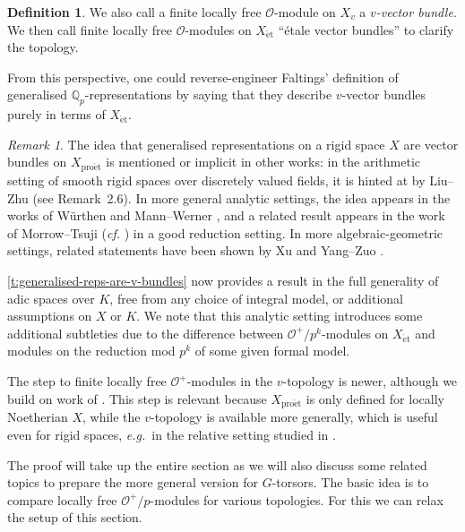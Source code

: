\documentclass[11pt]{amsart}
\numberwithin{equation}{section}
\theoremstyle{definition}
\newtheorem{Definition}[thm]{Definition}
\theoremstyle{remark}
\newtheorem{Remark}[thm]{Remark}
\renewcommand{\O}{\mathcal{O}}
\newcommand{\Q}{\mathbb{Q}}
\newcommand{\et}{{\operatorname{\acute{e}t}}}
\newcommand{\proet}{{\operatorname{pro\acute{e}t}}}
\begin{document}
\begin{Definition}
	We also call a finite locally free $\O$-module on $X_{v}$  a \emph{$v$-vector bundle}. We then call finite locally free $\O$-modules on $X_{\et}$ ``\'etale vector bundles'' to clarify the topology.
\end{Definition}


From this perspective, one could reverse-engineer Faltings' definition of generalised $\Q_p$-representations by saying that they describe $v$-vector bundles purely in terms of $X_{\et}$.

\begin{Remark}
  The idea that generalised representations on a rigid space $X$ are vector bundles on $X_{\proet}$  is mentioned or implicit in other works:  in the arithmetic setting of smooth rigid spaces over discretely valued fields, it is hinted at by Liu--Zhu \cite{LiuZhu_RiemannHilbert} (see Remark~2.6). In more general analytic  settings, the idea appears in the works of W\"urthen \cite[Introduction, p.~4006]{wuerthen_vb_on_rigid_var} and Mann--Werner \cite{MannWerner_LocSys_p-adVB}, and a related result appears in the work of Morrow--Tsuji (\textit{cf.} \cite[Theorem 5.7]{MorrowTsuji}) in a good reduction setting. In more algebraic-geometric settings, related statements have been shown by Xu  \cite[Section~3.29]{XuTransport_parallele} and Yang--Zuo \cite[Lemma~2.10]{YangZuo-padicSimpson}.
	
	 \cref{t:generalised-reps-are-v-bundles} now provides a result in the full generality of adic spaces over $K$, free from any choice of integral model, or additional assumptions on $X$ or $K$. We note that this analytic setting introduces some additional subtleties due to the difference between $\O^+/p^k$-modules on $X_{\et}$ and modules on the reduction mod $p^k$ of some given formal model.
	
	The step to finite locally free $\O^+$-modules in the $v$-topology is newer, although we build on work of \cite{MannWerner_LocSys_p-adVB}. This step is relevant because $X_{\proet}$  is only defined for locally Noetherian $X$, while the $v$-topology is available more generally, which is useful even for rigid spaces, \textit{e.g.}~in the relative setting studied in \cite{heuer-sheafified-paCS}.
\end{Remark}

The proof will take up the entire section as we will also discuss some related topics to prepare the more general version for $G$-torsors.
The basic idea is to compare locally free $\O^+/p$-modules for various topologies. For this we can relax the setup of this section. 
\end{document}

